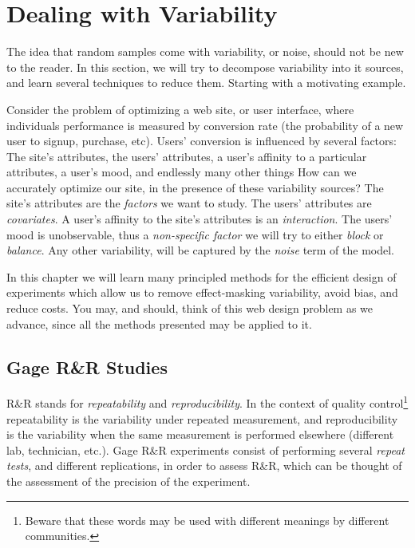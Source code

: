 \section{Dealing with Variability}
\label{sec:variance_components}

The idea that random samples come with variability, or noise, should not be new to the reader.
In this section, we will try to decompose variability into it sources, and learn several techniques to reduce them. 
Starting with a motivating example.



\begin{example}
\label{eg:variance_components}
Consider the problem of optimizing a web site, or user interface, where individuals performance is measured by conversion rate (the probability of a new user to signup, purchase, etc).
Users' conversion is influenced by several factors:
The site's attributes,
the users' attributes, 
a user's affinity to a particular attributes,  
a user's mood, 
and endlessly many other things
How can we accurately optimize our site, in the presence of these variability sources?
The site's attributes are the \emph{factors} we want to study.
The users' attributes are \emph{covariates}. 
A user's affinity to the site's attributes is an \emph{interaction}. 
The users' mood is unobservable, thus a \emph{non-specific factor} we will try to either \emph{block} or \emph{balance}.
Any other variability, will be captured by the \emph{noise} term of the model. 
\end{example}


In this chapter we will learn many principled methods for the efficient design of experiments which allow us to remove effect-masking variability, avoid bias, and reduce costs.
You may, and should, think of this web design problem as we advance, since all the methods presented may be applied to it.



\subsection{Gage R\&R Studies}
R\&R stands for \emph{repeatability} and \emph{reproducibility}.
In the context of quality control\footnote{Beware that these words may be used with different meanings by different communities.} repeatability is the variability under repeated measurement, and reproducibility is the variability when the same measurement is performed elsewhere (different lab, technician, etc.).
Gage R\&R experiments consist of performing several \emph{repeat tests}, and different replications, in order to assess R\&R, which can be thought of the assessment of the precision of the experiment. 




